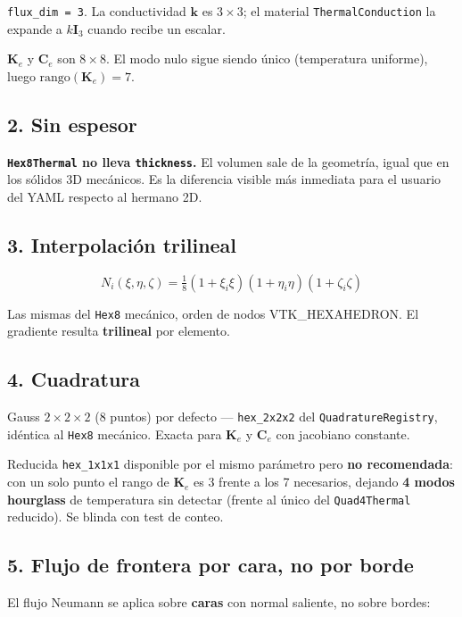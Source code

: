 \documentclass[11pt,letterpaper,oneside]{report}
\begin{document}
\texttt{flux\_dim = 3}. La conductividad $\mathbf k$ es $3\times3$; el material \texttt{ThermalConduction} la expande a $k\mathbf I_3$ cuando recibe un escalar.

$\mathbf K_e$ y $\mathbf C_e$ son $8\times8$. El modo nulo sigue siendo único (temperatura uniforme), luego $\text{rango}(\mathbf K_e) = 7$.

\subsection{2. Sin espesor}

\textbf{\texttt{Hex8Thermal} no lleva \texttt{thickness}.} El volumen sale de la geometría, igual que en los sólidos 3D mecánicos. Es la diferencia visible más inmediata para el usuario del YAML respecto al hermano 2D.

\subsection{3. Interpolación trilineal}

\[
N_i(\xi,\eta,\zeta) = \tfrac18(1+\xi_i\xi)(1+\eta_i\eta)(1+\zeta_i\zeta)
\]

Las mismas del \texttt{Hex8} mecánico, orden de nodos VTK\_HEXAHEDRON. El gradiente resulta \textbf{trilineal} por elemento.

\subsection{4. Cuadratura}

Gauss $2\times2\times2$ (8 puntos) por defecto --- \texttt{hex\_2x2x2} del \texttt{QuadratureRegistry}, idéntica al \texttt{Hex8} mecánico. Exacta para $\mathbf K_e$ y $\mathbf C_e$ con jacobiano constante.

Reducida \texttt{hex\_1x1x1} disponible por el mismo parámetro pero \textbf{no recomendada}: con un solo punto el rango de $\mathbf K_e$ es 3 frente a los 7 necesarios, dejando \textbf{4 modos hourglass} de temperatura sin detectar (frente al único del \texttt{Quad4Thermal} reducido). Se blinda con test de conteo.

\subsection{5. Flujo de frontera por cara, no por borde}

El flujo Neumann se aplica sobre \textbf{caras} con normal saliente, no sobre bordes:
\end{document}
